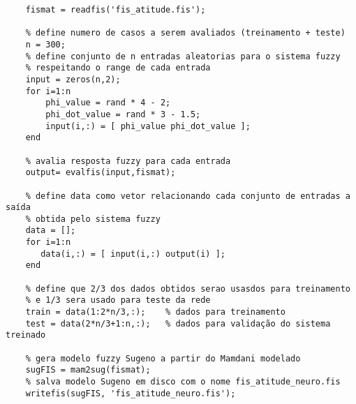\begin{lstlisting}[inputencoding=latin1]
	% le arquivo fis referente ao controle de atitude
	fismat = readfis('fis_atitude.fis'); 
	
	% define numero de casos a serem avaliados (treinamento + teste)
	n = 300;
	% define conjunto de n entradas aleatorias para o sistema fuzzy
	% respeitando o range de cada entrada
	input = zeros(n,2);
	for i=1:n
	    phi_value = rand * 4 - 2;
	    phi_dot_value = rand * 3 - 1.5;
	    input(i,:) = [ phi_value phi_dot_value ];
	end
	
	% avalia resposta fuzzy para cada entrada
	output= evalfis(input,fismat);
	
	% define data como vetor relacionando cada conjunto de entradas a saída
	% obtida pelo sistema fuzzy
	data = [];
	for i=1:n
	   data(i,:) = [ input(i,:) output(i) ];
	end
	
	% define que 2/3 dos dados obtidos serao usasdos para treinamento
	% e 1/3 sera usado para teste da rede
	train = data(1:2*n/3,:);    % dados para treinamento
	test = data(2*n/3+1:n,:);   % dados para validação do sistema treinado
	
	% gera modelo fuzzy Sugeno a partir do Mamdani modelado
	sugFIS = mam2sug(fismat);
	% salva modelo Sugeno em disco com o nome fis_atitude_neuro.fis
	writefis(sugFIS, 'fis_atitude_neuro.fis');
\end{lstlisting}